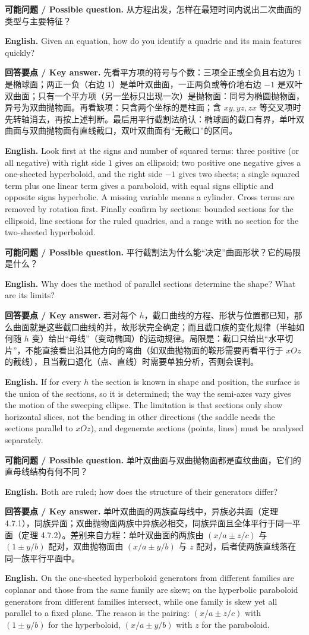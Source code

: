 \documentclass[UTF8,11pt,a4paper]{ctexart}
\newcommand{\EN}[1]{\par\noindent \textbf{English.} #1\par}
\newcommand{\ASK}[4]{\par\noindent \textbf{可能问题 / Possible question.} #1\par\EN{#2}\noindent \textbf{回答要点 / Key answer.} #3\par\EN{#4}\medskip}
\theoremstyle{definition}
\begin{document}
\ASK{从方程出发，怎样在最短时间内说出二次曲面的类型与主要特征？}{Given an equation, how do you identify a quadric and its main features quickly?}{先看平方项的符号与个数：三项全正或全负且右边为 $1$ 是椭球面；两正一负（右边 $1$）是单叶双曲面，一正两负或等价地右边 $-1$ 是双叶双曲面；只有一个平方项（另一坐标只出现一次）是抛物面：同号为椭圆抛物面，异号为双曲抛物面。再看缺项：只含两个坐标的是柱面；含 $xy,yz,zx$ 等交叉项时先转轴消去，再按上述判断。最后用平行截割法确认：椭球面的截口有界，单叶双曲面与双曲抛物面有直线截口，双叶双曲面有``无截口''的区间。}{Look first at the signs and number of squared terms: three positive (or all negative) with right side $1$ gives an ellipsoid; two positive one negative gives a one-sheeted hyperboloid, and the right side $-1$ gives two sheets; a single squared term plus one linear term gives a paraboloid, with equal signs elliptic and opposite signs hyperbolic. A missing variable means a cylinder. Cross terms are removed by rotation first. Finally confirm by sections: bounded sections for the ellipsoid, line sections for the ruled quadrics, and a range with no section for the two-sheeted hyperboloid.}

\ASK{平行截割法为什么能``决定''曲面形状？它的局限是什么？}{Why does the method of parallel sections determine the shape? What are its limits?}{若对每个 $h$，截口曲线的方程、形状与位置都已知，那么曲面就是这些截口曲线的并，故形状完全确定；而且截口族的变化规律（半轴如何随 $h$ 变）给出``母线''（变动椭圆）的运动规律。局限是：截口只给出``水平切片''，不能直接看出沿其他方向的弯曲（如双曲抛物面的鞍形需要再看平行于 $xOz$ 的截线），且当截口退化（点、直线）时需要单独分析，否则会误判。}{If for every $h$ the section is known in shape and position, the surface is the union of the sections, so it is determined; the way the semi-axes vary gives the motion of the sweeping ellipse. The limitation is that sections only show horizontal slices, not the bending in other directions (the saddle needs the sections parallel to $xOz$), and degenerate sections (points, lines) must be analysed separately.}

\ASK{单叶双曲面与双曲抛物面都是直纹曲面，它们的直母线结构有何不同？}{Both are ruled; how does the structure of their generators differ?}{单叶双曲面的两族直母线中，异族必共面（定理 4.7.1），同族异面；双曲抛物面两族中异族必相交，同族异面且全体平行于同一平面（定理 4.7.2）。差别来自方程：单叶双曲面的两族由 $(x/a\pm z/c)$ 与 $(1\pm y/b)$ 配对，双曲抛物面由 $(x/a\pm y/b)$ 与 $z$ 配对，后者使两族直线落在同一族平行平面中。}{On the one-sheeted hyperboloid generators from different families are coplanar and those from the same family are skew; on the hyperbolic paraboloid generators from different families intersect, while one family is skew yet all parallel to a fixed plane. The reason is the pairing: $(x/a\pm z/c)$ with $(1\pm y/b)$ for the hyperboloid, $(x/a\pm y/b)$ with $z$ for the paraboloid.}
\end{document}
